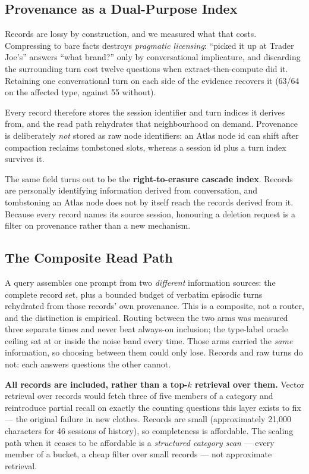 \subsection{Provenance as a Dual-Purpose Index}

Records are lossy by construction, and we measured what that costs. Compressing to bare facts destroys \emph{pragmatic licensing}: ``picked it up at Trader Joe's'' answers ``what brand?'' only by conversational implicature, and discarding the surrounding turn cost twelve questions when extract-then-compute did it. Retaining one conversational turn on each side of the evidence recovers it (63/64 on the affected type, against 55 without).

Every record therefore stores the session identifier and turn indices it derives from, and the read path rehydrates that neighbourhood on demand. Provenance is deliberately \emph{not} stored as raw node identifiers: an Atlas node id can shift after compaction reclaims tombstoned slots, whereas a session id plus a turn index survives it.

The same field turns out to be the \textbf{right-to-erasure cascade index}. Records are personally identifying information derived from conversation, and tombstoning an Atlas node does not by itself reach the records derived from it. Because every record names its source session, honouring a deletion request is a filter on provenance rather than a new mechanism.

\subsection{The Composite Read Path}

A query assembles one prompt from two \emph{different} information sources: the complete record set, plus a bounded budget of verbatim episodic turns rehydrated from those records' own provenance. This is a composite, not a router, and the distinction is empirical. Routing between the two arms was measured three separate times and never beat always-on inclusion; the type-label oracle ceiling sat at or inside the noise band every time. Those arms carried the \emph{same} information, so choosing between them could only lose. Records and raw turns do not: each answers questions the other cannot.

\textbf{All records are included, rather than a top-$k$ retrieval over them.} Vector retrieval over records would fetch three of five members of a category and reintroduce partial recall on exactly the counting questions this layer exists to fix --- the original failure in new clothes. Records are small (approximately 21{,}000 characters for 46 sessions of history), so completeness is affordable. The scaling path when it ceases to be affordable is a \emph{structured category scan} --- every member of a bucket, a cheap filter over small records --- not approximate retrieval.

